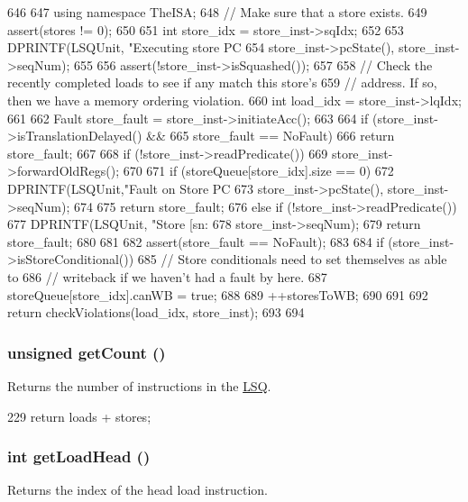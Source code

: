 \begin{DoxyCode}
646 {
647     using namespace TheISA;
648     // Make sure that a store exists.
649     assert(stores != 0);
650 
651     int store_idx = store_inst->sqIdx;
652 
653     DPRINTF(LSQUnit, "Executing store PC %
654             store_inst->pcState(), store_inst->seqNum);
655 
656     assert(!store_inst->isSquashed());
657 
658     // Check the recently completed loads to see if any match this store's
659     // address.  If so, then we have a memory ordering violation.
660     int load_idx = store_inst->lqIdx;
661 
662     Fault store_fault = store_inst->initiateAcc();
663 
664     if (store_inst->isTranslationDelayed() &&
665         store_fault == NoFault)
666         return store_fault;
667 
668     if (!store_inst->readPredicate())
669         store_inst->forwardOldRegs();
670 
671     if (storeQueue[store_idx].size == 0) {
672         DPRINTF(LSQUnit,"Fault on Store PC %
673                 store_inst->pcState(), store_inst->seqNum);
674 
675         return store_fault;
676     } else if (!store_inst->readPredicate()) {
677         DPRINTF(LSQUnit, "Store [sn:%
678                 store_inst->seqNum);
679         return store_fault;
680     }
681 
682     assert(store_fault == NoFault);
683 
684     if (store_inst->isStoreConditional()) {
685         // Store conditionals need to set themselves as able to
686         // writeback if we haven't had a fault by here.
687         storeQueue[store_idx].canWB = true;
688 
689         ++storesToWB;
690     }
691 
692     return checkViolations(load_idx, store_inst);
693 
694 }
\end{DoxyCode}
\hypertarget{classLSQUnit_a24ba9cb3fa1e726321780a20a960c8cd}{
\subsubsection[{getCount}]{\setlength{\rightskip}{0pt plus 5cm}unsigned getCount ()}}
\label{classLSQUnit_a24ba9cb3fa1e726321780a20a960c8cd}
Returns the number of instructions in the \hyperlink{classLSQ}{LSQ}. 


\begin{DoxyCode}
229 { return loads + stores; }
\end{DoxyCode}
\hypertarget{classLSQUnit_ad43a7408f4e1c1e181bc40ecab6dc593}{
\subsubsection[{getLoadHead}]{\setlength{\rightskip}{0pt plus 5cm}int getLoadHead ()}}
\label{classLSQUnit_ad43a7408f4e1c1e181bc40ecab6dc593}
Returns the index of the head load instruction. 


